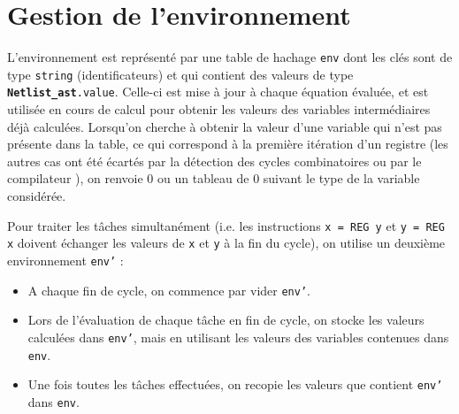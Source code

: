 \documentclass[a4paper, 10pt, french]{article}
\newcommand{\minijazz}{\bsc{MiniJazz}}
\newcommand{\code}[1]{\texttt{#1}}
\begin{document}
\section{Gestion de l'environnement}

L'environnement est représenté par une table de hachage \code{env} dont les clés sont de type \code{string} (identificateurs) et qui contient des valeurs de type \code{\textbf{Netlist\_ast}.value}. Celle-ci est mise à jour à chaque équation évaluée, et est utilisée en cours de calcul pour obtenir les valeurs des variables intermédiaires déjà calculées. Lorsqu'on cherche à obtenir la valeur d'une variable qui n'est pas présente dans la table, ce qui correspond à la première itération d'un registre (les autres cas ont été écartés par la détection des cycles combinatoires ou par le compilateur \minijazz), on renvoie 0 ou un tableau de 0 suivant le type de la variable considérée.

Pour traiter les tâches \og simultanément \fg (i.e. les instructions \code{x = REG y} et \code{y = REG x} doivent échanger les valeurs de \code{x} et \code{y} à la fin du cycle), on utilise un deuxième environnement \code{env'} :
\begin{itemize}
 \item A chaque fin de cycle, on commence par vider \code{env'}.
 \item Lors de l'évaluation de chaque tâche en fin de cycle, on stocke les valeurs calculées dans \code{env'}, mais en utilisant les valeurs des variables contenues dans \code{env}.
 \item Une fois toutes les tâches effectuées, on recopie les valeurs que contient \code{env'} dans \code{env}.
\end{itemize}
\end{document}
